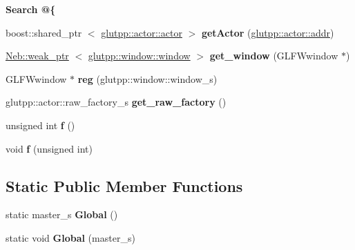 \begin{Indent}{\bf \-Search @\{}\par
\begin{DoxyCompactItemize}
\item 
\hypertarget{classglutpp_1_1master_a0820faa8de395f51d44144d6aa90a310}{boost\-::shared\-\_\-ptr\*
$<$ \hyperlink{classglutpp_1_1actor_1_1actor}{glutpp\-::actor\-::actor} $>$ {\bfseries get\-Actor} (\hyperlink{classglutpp_1_1actor_1_1addr}{glutpp\-::actor\-::addr})}\label{classglutpp_1_1master_a0820faa8de395f51d44144d6aa90a310}

\item 
\hypertarget{classglutpp_1_1master_a52f234f4ba1485910dc1590f7e0b8c33}{\hyperlink{classNeb_1_1weak__ptr}{\-Neb\-::weak\-\_\-ptr}\*
$<$ \hyperlink{classglutpp_1_1window_1_1window}{glutpp\-::window\-::window} $>$ {\bfseries get\-\_\-window} (\-G\-L\-F\-Wwindow $\ast$)}\label{classglutpp_1_1master_a52f234f4ba1485910dc1590f7e0b8c33}

\item 
\hypertarget{classglutpp_1_1master_a5ea9e9ca525ef83a119183ee3ada30aa}{\-G\-L\-F\-Wwindow $\ast$ {\bfseries reg} (glutpp\-::window\-::window\-\_\-s)}\label{classglutpp_1_1master_a5ea9e9ca525ef83a119183ee3ada30aa}

\item 
\hypertarget{classglutpp_1_1master_a7d3e7f660c81e0e34302167d58082a1b}{glutpp\-::actor\-::raw\-\_\-factory\-\_\-s {\bfseries get\-\_\-raw\-\_\-factory} ()}\label{classglutpp_1_1master_a7d3e7f660c81e0e34302167d58082a1b}

\item 
\hypertarget{classglutpp_1_1master_ac2a0598fc64a3539f7420bdde0df3c70}{unsigned int {\bfseries f} ()}\label{classglutpp_1_1master_ac2a0598fc64a3539f7420bdde0df3c70}

\item 
\hypertarget{classglutpp_1_1master_a29cbe228119a761cf28a55a716cb3e12}{void {\bfseries f} (unsigned int)}\label{classglutpp_1_1master_a29cbe228119a761cf28a55a716cb3e12}

\end{DoxyCompactItemize}
\end{Indent}
\subsection*{\-Static \-Public \-Member \-Functions}
\begin{DoxyCompactItemize}
\item 
\hypertarget{classglutpp_1_1master_a6b0305d3c835658a32055b3f3e352768}{static master\-\_\-s {\bfseries \-Global} ()}\label{classglutpp_1_1master_a6b0305d3c835658a32055b3f3e352768}

\item 
\hypertarget{classglutpp_1_1master_a94dc3d3ac3b32a747f7e998a8a7fa881}{static void {\bfseries \-Global} (master\-\_\-s)}\label{classglutpp_1_1master_a94dc3d3ac3b32a747f7e998a8a7fa881}

\end{DoxyCompactItemize}
